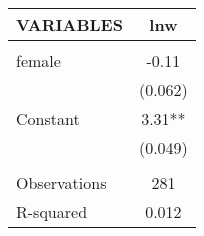 \begin{tabular}{lc} \hline
VARIABLES & lnw \\ \hline
 &  \\
female & -0.11 \\
 & (0.062) \\
Constant & 3.31** \\
 & (0.049) \\
 &  \\
Observations & 281 \\
 R-squared & 0.012 \\ \hline
\end{tabular}

